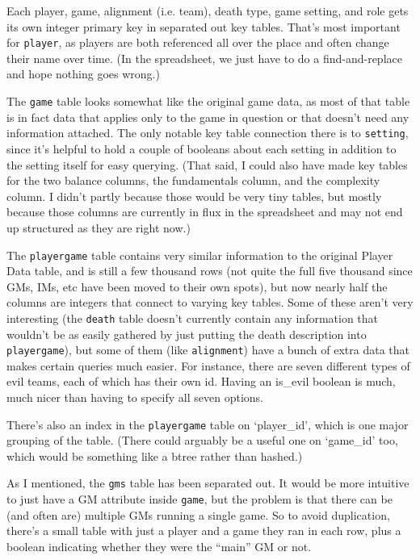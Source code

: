 \documentclass[11pt, oneside]{amsart}   	%
\begin{document}
Each player, game, alignment (i.e. team), death type, game setting, and role gets its own integer primary key in separated out key tables. That's most important for \texttt{player}, as players are both referenced all over the place and often change their name over time. (In the spreadsheet, we just have to do a find-and-replace and hope nothing goes wrong.) 

The \texttt{game} table looks somewhat like the original game data, as most of that table is in fact data that applies only to the game in question or that doesn't need any information attached. The only notable key table connection there is to \texttt{setting}, since it's helpful to hold a couple of booleans about each setting in addition to the setting itself for easy querying. (That said, I could also have made key tables for the two balance columns, the fundamentals column, and the complexity column. I didn't partly because those would be very tiny tables, but mostly because those columns are currently in flux in the spreadsheet and may not end up structured as they are right now.)

The \texttt{playergame} table contains very similar information to the original Player Data table, and is still a few thousand rows (not quite the full five thousand since GMs, IMs, etc have been moved to their own spots), but now nearly half the columns are integers that connect to varying key tables. Some of these aren't very interesting (the \texttt{death} table doesn't currently contain any information that wouldn't be as easily gathered by just putting the death description into \texttt{playergame}), but some of them (like \texttt{alignment}) have a bunch of extra data that makes certain queries much easier. For instance, there are seven different types of evil teams, each of which has their own id. Having an is\_evil boolean is much, much nicer than having to specify all seven options.

There's also an index in the \texttt{playergame} table on `player\_id', which is one major grouping of the table. (There could arguably be a useful one on `game\_id' too, which would be something like a btree rather than hashed.)

As I mentioned, the \texttt{gms} table has been separated out. It would be more intuitive to just have a GM attribute inside \texttt{game}, but the problem is that there can be (and often are) multiple GMs running a single game. So to avoid duplication, there's a small table with just a player and a game they ran in each row, plus a boolean indicating whether they were the ``main'' GM or not. 
\end{document}
